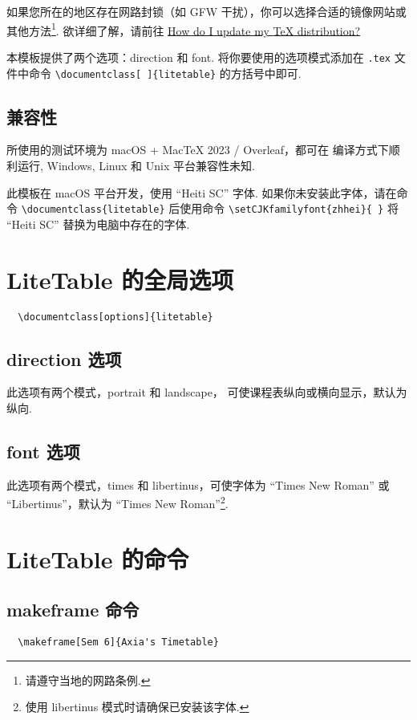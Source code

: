 \documentclass[11pt]{article}
\def\pkg#1{\texorpdfstring{\textcolor{pkgcolor}{\textsf{#1}}}{“#1”}}
\def\mode#1{\texorpdfstring{\textcolor{moducolor}{\textsf{#1}}}{“#1”}}
\def\cmd#1{\texorpdfstring{\textcolor{cmdcolor}{\textsf{#1}}}{“#1”}}
\begin{document}
如果您所在的地区存在网路封锁（如 GFW 干扰），你可以选择合适的镜像网站或其他方法\footnote{请遵守当地的网路条例.}. 欲详细了解，请前往 \href{https://tex.stackexchange.com/questions/55437/how-do-i-update-my-tex-distribution}{How do I update my \textsf{\TeX} distribution?}

本模板提供了两个选项：\mode{direction} 和 \mode{font}. 将你要使用的选项模式添加在 \verb|.tex| 文件中命令 \verb|\documentclass[ ]{litetable}| 的方括号中即可.

\subsection{兼容性}
所使用的测试环境为 macOS + MacTeX 2023 / Overleaf，都可在 \XeLaTeX{} 编译方式下顺利运行, Windows, Linux 和 Unix 平台兼容性未知.

此模板在 macOS 平台开发，使用 ``Heiti SC'' 字体. 如果你未安装此字体，请在命令 \verb|\documentclass{litetable}| 后使用命令 \verb|\setCJKfamilyfont{zhhei}{ }| 将 ``Heiti SC'' 替换为电脑中存在的字体.

\section{\pkg{LiteTable} 的全局选项}
\begin{verbatim}
  \documentclass[options]{litetable}
\end{verbatim}

\subsection{\mode{direction} 选项}
此选项有两个模式，\mode{portrait} 和 \mode{landscape}， 可使课程表纵向或横向显示，默认为纵向.

\subsection{\mode{font} 选项}
此选项有两个模式，\mode{times} 和 \mode{libertinus}，可使字体为 ``Times New Roman'' 或 ``Libertinus''，默认为 ``Times New Roman''\footnote{使用 \mode{libertinus} 模式时请确保已安装该字体.}.

\section{\pkg{LiteTable} 的命令}

\subsection{\cmd{makeframe} 命令}
\begin{verbatim}
  \makeframe[Sem 6]{Axia's Timetable}
\end{verbatim}
\end{document}
